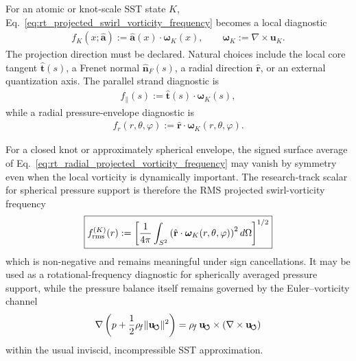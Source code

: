 For an atomic or knot-scale SST state $K$, Eq.~\eqref{eq:rt_projected_swirl_vorticity_frequency} becomes a local diagnostic
\begin{align}
    f_K(x;\hat{\mathbf a})
    :=
    \hat{\mathbf a}(x)\cdot\boldsymbol{\omega}_K(x),
    \qquad
    \boldsymbol{\omega}_K:=\nabla\times\mathbf u_K .
    \label{eq:rt_knot_projected_vorticity_frequency}
\end{align}
The projection direction must be declared.  Natural choices include the local core tangent $\hat{\mathbf t}(s)$, a Frenet normal $\hat{\mathbf n}_F(s)$, a radial direction $\hat{\mathbf r}$, or an external quantization axis.  The parallel strand diagnostic is
\begin{align}
    f_{\parallel}(s)
    :=
    \hat{\mathbf t}(s)\cdot\boldsymbol{\omega}_K(s),
    \label{eq:rt_parallel_strand_vorticity_frequency}
\end{align}
while a radial pressure-envelope diagnostic is
\begin{align}
    f_r(r,\theta,\varphi)
    :=
    \hat{\mathbf r}\cdot\boldsymbol{\omega}_K(r,\theta,\varphi).
    \label{eq:rt_radial_projected_vorticity_frequency}
\end{align}

For a closed knot or approximately spherical envelope, the signed surface average of Eq.~\eqref{eq:rt_radial_projected_vorticity_frequency} may vanish by symmetry even when the local vorticity is dynamically important.  The research-track scalar for spherical pressure support is therefore the RMS projected swirl-vorticity frequency
\begin{align}
    \boxed{
    f_{\rm rms}^{(K)}(r)
    :=
    \left[
    \frac{1}{4\pi}
    \int_{S^2}
    \left(
        \hat{\mathbf r}\cdot\boldsymbol{\omega}_K(r,\theta,\varphi)
    \right)^2
    d\Omega
    \right]^{1/2}
    }
    \label{eq:rt_rms_projected_swirl_vorticity_frequency}
\end{align}
which is non-negative and remains meaningful under sign cancellations.  It may be used as a rotational-frequency diagnostic for spherically averaged pressure support, while the pressure balance itself remains governed by the Euler--vorticity channel
\begin{align}
    \nabla\left(
        p+\frac12\rho_{\!f}\lVert\mathbf{u}_{\!\boldsymbol{\circlearrowleft}}\rVert^2
    \right)
    =
    \rho_{\!f}\,\mathbf{u}_{\!\boldsymbol{\circlearrowleft}}\times(\nabla\times\mathbf{u}_{\!\boldsymbol{\circlearrowleft}})
    \label{eq:rt_projected_frequency_euler_vorticity_guard}
\end{align}
within the usual inviscid, incompressible SST approximation.

